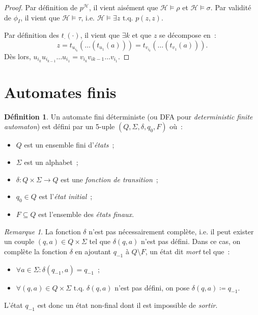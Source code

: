 \documentclass{article}
\theoremstyle{definition}
\newtheorem{déf}[thm]{Définition}
\theoremstyle{remark}
\newtheorem*{rmq}{Remarque}
\newcommand{\tq}{\text{ t.q. }}
\begin{document}
\begin{proof}
		Par définition de $p^{\mathcal H}$, il vient aisément que $\mathcal H \models \rho$ et $\mathcal H \models \sigma$. Par validité de $\phi_I$, il vient
		que $\mathcal H \models \tau$, i.e. $\mathcal H \models \exists z \tq p(z, z)$.

		Par définition des $t_{\cdot}(\cdot)$, il vient que $\exists k$ et que $z$ se décompose en~:
		\[z = t_{u_{i_k}}(\ldots(t_{u_1}(a))) = t_{v_{i_k}}(\ldots(t_{v_1}(a))).\]
		Dès lors, $u_{i_k}u_{i_{k-1}}\ldots u_{i_1} = v_{i_k}v_{i{k-1}}\ldots v_{i_1}.$
		\end{proof}

\section{Automates finis}
	\begin{déf} Un automate fini déterministe (ou DFA pour \textit{deterministic finite automaton}) est défini par un 5-uple $(Q, \Sigma, \delta, q_0, F)$ où~:
	\begin{itemize}
		\item $Q$ est un ensemble fini d'\textit{états}~;
		\item $\Sigma$ est un alphabet~;
		\item $\delta : Q \times \Sigma \to Q$ est une \textit{fonction de transition}~;
		\item $q_0 \in Q$ est l'\textit{état initial}~;
		\item $F \subseteq Q$ est l'ensemble des \textit{états finaux}.
	\end{itemize}
	\end{déf}

	\begin{rmq} La fonction $\delta$ n'est pas nécessairement complète, i.e. il peut exister un couple $(q, a) \in Q \times \Sigma$ tel que $\delta(q, a)$ n'est
	pas défini. Dans ce cas, on complète la fonction $\delta$ en ajoutant $q_{-1}$ à $Q \setminus F$, un état dit \textit{mort} tel que~:
	\begin{itemize}
		\item $\forall a \in \Sigma : \delta(q_{-1}, a) = q_{-1}$~;
		\item $\forall (q, a) \in Q \times \Sigma \tq \delta(q, a)$ n'est pas défini, on pose $\delta(q, a) \coloneqq q_{-1}$.
	\end{itemize}

	L'état $q_{-1}$ est donc un état non-final dont il est impossible de \textit{sortir}.
	\end{rmq}
\end{document}

